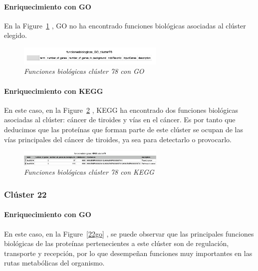 \paragraph{Enriquecimiento con GO}

En la Figure~\ref{78go} , GO no ha encontrado funciones biológicas asociadas al clúster elegido.

\begin{figure}[h]
	\centering
	\includegraphics[width=70mm,scale=1.2]{figures/cluster78_GO.png}
	\caption{\textit{Funciones biológicas clúster 78 con GO}}
	\label{78go}
\end{figure}

\paragraph{Enriquecimiento con KEGG}

En este caso, en la Figure~\ref{78kegg} , KEGG ha encontrado dos funciones biológicas asociadas al clúster: cáncer de tiroides y vías en el cáncer. Es por tanto que deducimos que las proteínas que forman parte de este clúster se ocupan de las vías principales del cáncer de tiroides, ya sea para detectarlo o provocarlo. 

\begin{figure}[h]
	\centering
	\includegraphics[width=70mm,scale=1.2]{figures/cluster78_KEGG.png}
	\caption{\textit{Funciones biológicas clúster 78 con KEGG}}
	\label{78kegg}
\end{figure}

\subsubsection{Clúster 22}

\paragraph{Enriquecimiento con GO}

En este caso, en la Figure~\ref{22go} , se puede observar que las principales funciones biológicas de las proteínas pertenecientes a este clúster son de regulación, transporte y recepción, por lo que desempeñan funciones muy importantes en las rutas metabólicas del organismo. 

